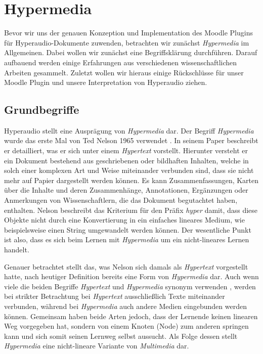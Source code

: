 \section{Hypermedia}
Bevor wir uns der genauen Konzeption und Implementation des Moodle Plugins für Hyperaudio-Dokumente zuwenden, betrachten wir zunächst \textit{Hypermedia} im Allgemeinen. Dabei wollen wir zunächst eine Begriffsklärung durchführen. Darauf aufbauend werden einige Erfahrungen aus verschiedenen wissenschaftlichen Arbeiten gesammelt. Zuletzt wollen wir hieraus einige Rückschlüsse für unser Moodle Plugin und unsere Interpretation von Hyperaudio ziehen.


\subsection{Grundbegriffe}
Hyperaudio stellt eine Ausprägung von \textit{Hypermedia} dar. Der Begriff \textit{Hypermedia} wurde das erste Mal von Ted Nelson 1965 verwendet \citep{nelson1965complex}. In seinem Paper beschreibt er detailliert, was er sich unter einem \textit{Hypertext} vorstellt. Hierunter versteht er ein Dokument bestehend aus geschriebenen oder bildhaften Inhalten, welche in solch einer komplexen Art und Weise miteinander verbunden sind, dass sie nicht mehr auf Papier dargestellt werden können. Es kann Zusammenfassungen, Karten über die Inhalte und deren Zusammenhänge, Annotationen, Ergänzungen oder Anmerkungen von Wissenschaftlern, die das Dokument begutachtet haben, enthalten. Nelson beschreibt das Kriterium für den Präfix \textit{hyper} damit, dass diese Objekte nicht durch eine Konvertierung in ein einfaches lineares Medium, wie beispielsweise einen String umgewandelt werden können. Der wesentliche Punkt ist also, dass es sich beim Lernen mit \textit{Hypermedia} um ein nicht-lineares Lernen handelt.

Genauer betrachtet stellt das, was Nelson sich damals als \textit{Hypertext} vorgestellt hatte, nach heutiger Definition bereits eine Form von \textit{Hypermedia} dar. Auch wenn viele die beiden Begriffe \textit{Hypertext} und \textit{Hypermedia} synonym verwenden \citep{nielsen2013multimedia}, werden bei strikter Betrachtung bei \textit{Hypertext} ausschließlich Texte miteinander verbunden, während bei \textit{Hypermedia} auch andere Medien eingebunden werden können. Gemeinsam haben beide Arten jedoch, dass der Lernende keinen linearen Weg vorgegeben hat, sondern von einem Knoten (Node) zum anderen springen kann und sich somit seinen Lernweg selbst aussucht. Als Folge dessen stellt \textit{Hypermedia} eine nicht-lineare Variante von \textit{Multimedia} dar.


